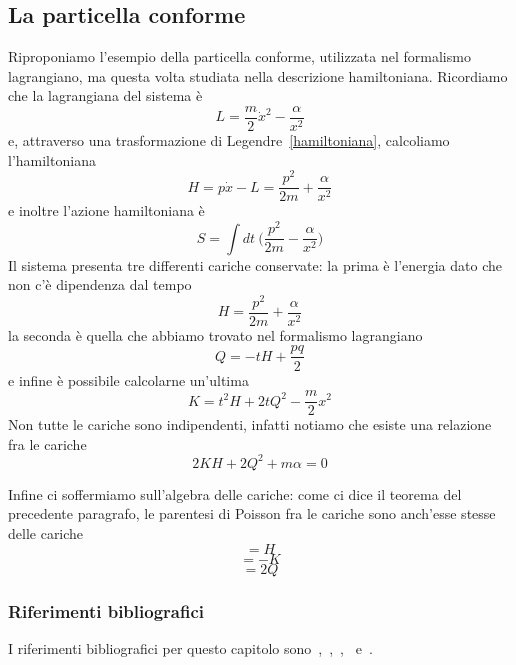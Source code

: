 \subsection{La particella conforme}
    Riproponiamo l'esempio della particella conforme, utilizzata nel formalismo lagrangiano, ma questa volta studiata nella descrizione hamiltoniana. Ricordiamo che la lagrangiana del sistema è 
\begin{equation*}
    L = \frac{m}{2} \dot x^2 - \frac{\alpha}{x^2}
\end{equation*}
    e, attraverso una trasformazione di Legendre~\eqref{hamiltoniana}, calcoliamo l'hamiltoniana
\begin{equation*}
    H = p \dot x - L = \frac{p^2}{2m} + \frac{\alpha}{x^2}
\end{equation*}
    e inoltre l'azione hamiltoniana è
\begin{equation*}
    S = \int dt~ \Big (\frac{p^2}{2m} - \frac{\alpha}{x^2} \Big)
\end{equation*}
    Il sistema presenta tre differenti cariche conservate: la prima è l'energia dato che non c'è dipendenza dal tempo
\begin{equation*}
    H = \frac{p^2}{2m} + \frac{\alpha}{x^2}
\end{equation*}
    la seconda è quella che abbiamo trovato nel formalismo lagrangiano
\begin{equation*}
    Q = -tH + \frac{pq}{2}
\end{equation*}
    e infine è possibile calcolarne un'ultima
\begin{equation*}
    K = t^2H + 2 t Q^2 - \frac{m}{2} x^2
\end{equation*}  
    Non tutte le cariche sono indipendenti, infatti notiamo che esiste una relazione fra le cariche 
\begin{equation*}
    2KH + 2Q^2 + m\alpha = 0
\end{equation*}

    Infine ci soffermiamo sull'algebra delle cariche: come ci dice il teorema del precedente paragrafo, le parentesi di Poisson fra le cariche sono anch'esse stesse delle cariche
\begin{equation}
    [Q, ~H] = H
\end{equation}
\begin{equation}
    [Q, ~K] = -K
\end{equation}
\begin{equation}
    [K, ~H] = 2Q
\end{equation}

\subsubsection{Riferimenti bibliografici}
    I riferimenti bibliografici per questo capitolo sono~\cite{landaumecc},~\cite{goldstein},~\cite{banados},~\cite{hill} e~\cite{bastianelli}.
